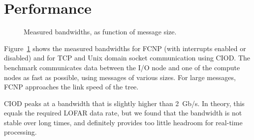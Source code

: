 \documentclass[journal]{IEEEtran}
\begin{document}



\section{Performance}
\label{sec:performance}

\begin{figure}[t]
\hfill
{}
\caption{Measured bandwidths, as function of message size.}
\label{fig:performance}
\end{figure}

Figure~\ref{fig:performance} shows the measured bandwidths for FCNP (with
interrupts enabled or disabled) and for TCP and Unix domain socket
communication using CIOD.
The benchmark communicates data between the I/O node and one of the compute
nodes as fast as possible, using messages of various sizes.
For large messages, FCNP approaches the link speed of the tree.

CIOD peaks at a bandwidth that is slightly higher than 2~Gb/s.
In theory, this equals the required LOFAR data rate, but we found that the
bandwidth is not stable over long times, and definitely provides too little
headroom for real-time processing.
\end{document}
